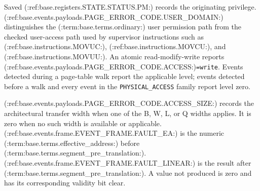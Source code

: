 Saved (:ref:base.registers.STATE.STATUS.PM:) records the originating privilege. (:ref:base.events.payloads.PAGE_ERROR_CODE.USER_DOMAIN:) distinguishes the (:term:base.terms.ordinary:) user
permission path from the checked user-access path used by supervisor instructions such as (:ref:base.instructions.MOVUC:),
(:ref:base.instructions.MOVCU:), and (:ref:base.instructions.MOVUU:). An atomic read-modify-write reports (:ref:base.events.payloads.PAGE_ERROR_CODE.ACCESS:)\texttt{=write}. Events detected
during a page-table walk report the applicable level; events detected before a walk and every event in the
\texttt{PHYSICAL\_ACCESS} family report level zero.

(:ref:base.events.payloads.PAGE_ERROR_CODE.ACCESS_SIZE:) records the architectural transfer width when one of the B, W, L, or Q widths applies. It is
zero when no such width is available or applicable. (:ref:base.events.frame.EVENT_FRAME.FAULT_EA:) is the numeric (:term:base.terms.effective_address:) before
(:term:base.terms.segment_pre_translation:). (:ref:base.events.frame.EVENT_FRAME.FAULT_LINEAR:) is the result after (:term:base.terms.segment_pre_translation:). A value not produced is
zero and has its corresponding validity bit clear.
